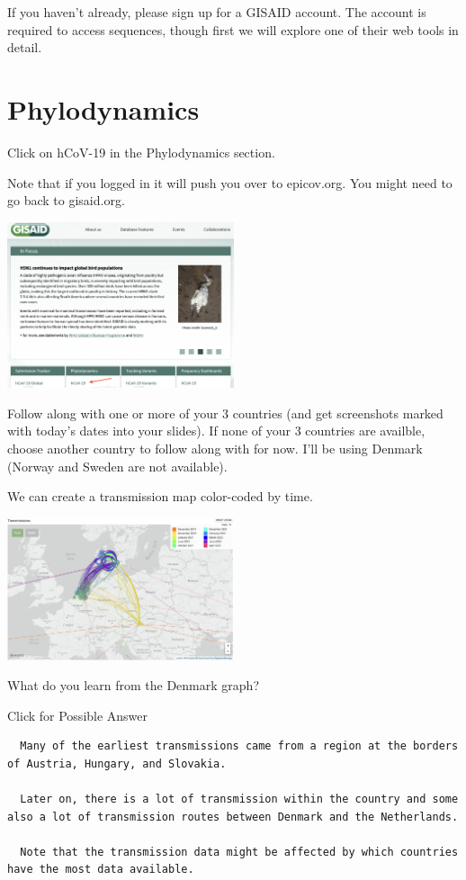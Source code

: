 \documentclass[
]{book}
\begin{document}
If you haven't already, please sign up for a GISAID account. The account is required to access sequences, though first we will explore one of their web tools in detail.

\hypertarget{phylodynamics}{%
\section{Phylodynamics}\label{phylodynamics}}

Click on hCoV-19 in the Phylodynamics section.

Note that if you logged in it will push you over to epicov.org. You might need to go back to gisaid.org.

\includegraphics[width=0.5\textwidth,height=\textheight]{./Figures/Phylodynamics.png}

Follow along with one or more of your 3 countries (and get screenshots marked with today's dates into your slides). If none of your 3 countries are availble, choose another country to follow along with for now. I'll be using Denmark (Norway and Sweden are not available).

We can create a transmission map color-coded by time.

\includegraphics[width=0.5\textwidth,height=\textheight]{./Figures/DenmarkTransmission.png}

What do you learn from the Denmark graph?

Click for Possible Answer

\begin{verbatim}
  Many of the earliest transmissions came from a region at the borders of Austria, Hungary, and Slovakia.
  
  Later on, there is a lot of transmission within the country and some also a lot of transmission routes between Denmark and the Netherlands.
  
  Note that the transmission data might be affected by which countries have the most data available.
\end{verbatim}
\end{document}
